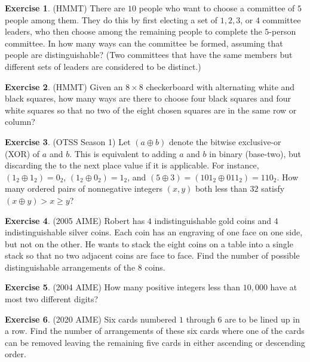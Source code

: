 \documentclass[l1pt]{article}
\theoremstyle{plain}
\theoremstyle{definition}
\newtheorem{exercise}{Exercise}[section]
\theoremstyle{remark}
\begin{document}
\begin{exercise}
(HMMT) There are $10$ people who want to choose a committee of $5$ people among them. They do this by first electing a set of $1, 2, 3$, or $4$ committee leaders, who then choose among the remaining people to complete the $5$-person committee. In how many ways can the committee be formed, assuming that people are distinguishable? (Two committees that have the same members but different sets of leaders are considered to be distinct.)
\end{exercise}

\begin{exercise}
(HMMT) Given an $8\times 8$ checkerboard with alternating white and black squares, how many ways are there to choose four black squares and four white squares so that no two of the eight chosen squares are in the same row or column?
\end{exercise}


\begin{exercise}
(OTSS Season 1) Let $(a \oplus b)$ denote the bitwise exclusive-or (XOR) of $a$ and $b$. This is equivalent to adding $a$ and $b$ in binary (base-two), but discarding the  to the next place value if it is applicable. For instance, $(1_2 \oplus 1_2) = 0_2$, $(1_2 \oplus 0_2) = 1_2$, and $(5\oplus 3)= (101_2\oplus 011_2)= 110_2$. How many ordered pairs of nonnegative integers $(x,y)$ both less than $32$ satisfy $(x \oplus y) > x \geq y$?
\end{exercise}

\begin{exercise}
(2005 AIME) Robert has $4$ indistinguishable gold coins and $4$ indistinguishable silver coins. Each coin has an engraving of one face on one side, but not on the other. He wants to stack the eight coins on a table into a single stack so that no two adjacent coins are face to face. Find the number of possible distinguishable arrangements of the $8$ coins.
\end{exercise}

\begin{exercise}
(2004 AIME) How many positive integers less than $10,000$ have at most two different digits?
\end{exercise}

\begin{exercise}
(2020 AIME) Six cards numbered $1$ through $6$ are to be lined up in a row. Find the number of arrangements of these six cards where one of the cards can be removed leaving the remaining five cards in either ascending or descending order.
\end{exercise}
\end{document}
